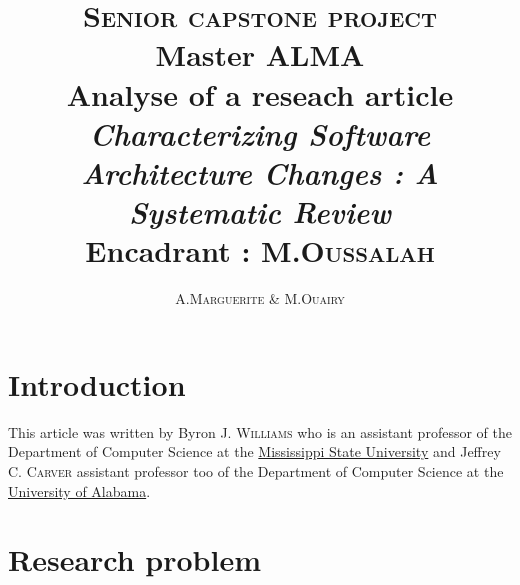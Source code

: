 \documentclass[12pt]{article}
\title{ {\huge \textsc{Senior capstone project}} \\  Master ALMA  \\ \textbf{Analyse of a reseach article} \\ \emph{Characterizing Software Architecture Changes : A Systematic Review}\\{\small Encadrant :  M.\textsc{Oussalah}}}
\author{A.\textsc{Marguerite} \& M.\textsc{Ouairy}}
\begin{document}
\maketitle
\renewcommand{\labelitemi}{$\bullet$} 



\section{Introduction}\label{sec:intro}
This article was written by Byron J. \textsc{Williams} who is an assistant professor of the Department of Computer Science at the \href{http://www.msstate.edu/}{Mississippi State University} and Jeffrey C. \textsc{Carver} assistant professor too of the Department of Computer Science at the \href{http://www.ua.edu/}{University of Alabama}.


\section{Research problem}\label{sec:pblm}
\end{document}
